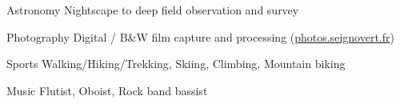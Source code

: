 
\begin{cvskills}

	\cvskill
		{Astronomy}
    {Nightscape to deep field observation and survey}

	\cvskill
		{Photography}
    {Digital / B\&W film capture and processing (\href{https://photos.seignovert.fr/}{photos.seignovert.fr})}

	\cvskill
    {Sports}
    {Walking/Hiking/Trekking, Skiing, Climbing, Mountain biking}

	\cvskill
    {Music}
    {Flutist, Oboist, Rock band bassist}

\end{cvskills}
